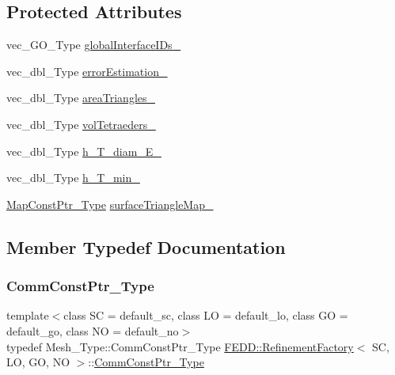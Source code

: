 \subsection*{Protected Attributes}
\begin{DoxyCompactItemize}
\item 
vec\+\_\+\+G\+O\+\_\+\+Type \hyperlink{classFEDD_1_1RefinementFactory_ae71ae7a6d0586a37cdc2aadfafeb00c4}{global\+Interface\+I\+Ds\+\_\+}
\item 
vec\+\_\+dbl\+\_\+\+Type \hyperlink{classFEDD_1_1RefinementFactory_ae04f877455828ca9d2328b6b29a72652}{error\+Estimation\+\_\+}
\item 
vec\+\_\+dbl\+\_\+\+Type \hyperlink{classFEDD_1_1RefinementFactory_ac8f78b4bd97729d0ca0a3a36097da107}{area\+Triangles\+\_\+}
\item 
vec\+\_\+dbl\+\_\+\+Type \hyperlink{classFEDD_1_1RefinementFactory_a7043a525164368b18359a399dede06c3}{vol\+Tetraeders\+\_\+}
\item 
vec\+\_\+dbl\+\_\+\+Type \hyperlink{classFEDD_1_1RefinementFactory_ad1c44661ff740905f2b3634ea285e1a7}{h\+\_\+\+T\+\_\+diam\+\_\+\+E\+\_\+}
\item 
vec\+\_\+dbl\+\_\+\+Type \hyperlink{classFEDD_1_1RefinementFactory_add2c3dc6ee30afaf225baed853475e06}{h\+\_\+\+T\+\_\+min\+\_\+}
\item 
\hyperlink{classFEDD_1_1RefinementFactory_a8256ccdf1b2a5c977ddc011f4e8eb8d3}{Map\+Const\+Ptr\+\_\+\+Type} \hyperlink{classFEDD_1_1RefinementFactory_ae21de28f0848c556b0c90cf6f912de25}{surface\+Triangle\+Map\+\_\+}
\end{DoxyCompactItemize}


\subsection{Member Typedef Documentation}
\mbox{\label{classFEDD_1_1RefinementFactory_a58381e0786c65ec61d11bc73c224b45a}} 
\subsubsection{\texorpdfstring{Comm\+Const\+Ptr\+\_\+\+Type}{CommConstPtr\_Type}}
{\footnotesize\ttfamily template$<$class SC = default\+\_\+sc, class LO = default\+\_\+lo, class GO = default\+\_\+go, class NO = default\+\_\+no$>$ \\
typedef Mesh\+\_\+\+Type\+::\+Comm\+Const\+Ptr\+\_\+\+Type \hyperlink{classFEDD_1_1RefinementFactory}{F\+E\+D\+D\+::\+Refinement\+Factory}$<$ SC, LO, GO, NO $>$\+::\hyperlink{classFEDD_1_1RefinementFactory_a58381e0786c65ec61d11bc73c224b45a}{Comm\+Const\+Ptr\+\_\+\+Type}}

